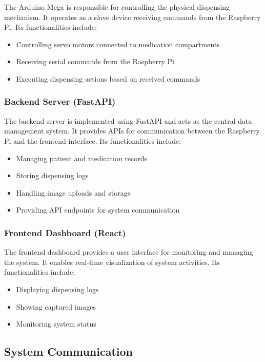 The Arduino Mega is responsible for controlling the physical dispensing mechanism. It operates as a slave device receiving commands from the Raspberry Pi. Its functionalities include:

\begin{itemize}
    \item Controlling servo motors connected to medication compartments
    \item Receiving serial commands from the Raspberry Pi
    \item Executing dispensing actions based on received commands
\end{itemize}

\subsubsection{Backend Server (FastAPI)}

The backend server is implemented using FastAPI and acts as the central data management system. It provides APIs for communication between the Raspberry Pi and the frontend interface. Its functionalities include:

\begin{itemize}
    \item Managing patient and medication records
    \item Storing dispensing logs
    \item Handling image uploads and storage
    \item Providing API endpoints for system communication
\end{itemize}

\subsubsection{Frontend Dashboard (React)}

The frontend dashboard provides a user interface for monitoring and managing the system. It enables real-time visualization of system activities. Its functionalities include:

\begin{itemize}
    \item Displaying dispensing logs
    \item Showing captured images
    \item Monitoring system status
\end{itemize}

\subsection{System Communication}

